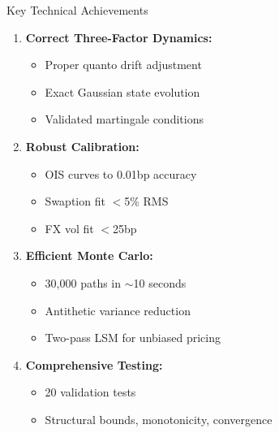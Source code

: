 \documentclass[aspectratio=169,11pt]{beamer}
\begin{document}
\begin{frame}{Key Technical Achievements}
\begin{enumerate}
    \item \textbf{Correct Three-Factor Dynamics:}
    \begin{itemize}
        \item Proper quanto drift adjustment
        \item Exact Gaussian state evolution
        \item Validated martingale conditions
    \end{itemize}

    \item \textbf{Robust Calibration:}
    \begin{itemize}
        \item OIS curves to 0.01bp accuracy
        \item Swaption fit $<$5\% RMS
        \item FX vol fit $<$25bp
    \end{itemize}

    \item \textbf{Efficient Monte Carlo:}
    \begin{itemize}
        \item 30,000 paths in $\sim$10 seconds
        \item Antithetic variance reduction
        \item Two-pass LSM for unbiased pricing
    \end{itemize}

    \item \textbf{Comprehensive Testing:}
    \begin{itemize}
        \item 20 validation tests
        \item Structural bounds, monotonicity, convergence
    \end{itemize}
\end{enumerate}
\end{frame}
\end{document}
